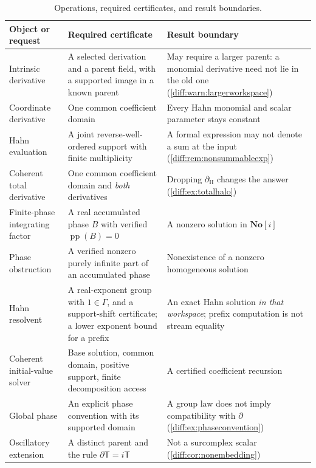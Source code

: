 \documentclass[11pt,letterpaper]{article}
\numberwithin{equation}{section}
\theoremstyle{definition}
\theoremstyle{remark}
\newcommand{\SC}{\mathbf{No}[i]}
\newcommand{\der}{\partial}
\newcommand{\pp}{\operatorname{pp}}
\newcommand{\dercoef}{\der_{\mathrm H}}
\begin{document}
\begin{table}[htbp]
\centering\small
\caption{Operations, required certificates, and result boundaries.}
\label{diff:tab:interface}
\begin{tabularx}{\textwidth}{@{}L{0.24\textwidth}YL{0.27\textwidth}@{}}
\toprule
Object or request & Required certificate & Result boundary \\
\midrule
Intrinsic derivative &
A selected derivation and a parent field, with a supported image in a known
parent &
May require a larger parent: a monomial derivative need not lie in the old one
(\cref{diff:warn:largerworkspace}) \\[0.35em]
Coordinate derivative &
One common coefficient domain &
Every Hahn monomial and scalar parameter stays constant \\[0.35em]
Hahn evaluation &
A joint reverse-well-ordered support with finite multiplicity &
A formal expression may not denote a sum at the input
(\cref{diff:rem:nonsummableexp}) \\[0.35em]
Coherent total derivative &
One common coefficient domain and \emph{both} derivatives &
Dropping $\dercoef$ changes the answer
(\cref{diff:ex:totalhalo}) \\[0.35em]
Finite-phase integrating factor &
A real accumulated phase $B$ with verified $\pp(B)=0$ &
A nonzero solution in $\SC$ \\[0.35em]
Phase obstruction &
A verified nonzero purely infinite part of an accumulated phase &
Nonexistence of a nonzero homogeneous solution \\[0.35em]
Hahn resolvent &
A real-exponent group with $1\in\Gamma$, and a support-shift certificate; a
lower exponent bound for a prefix &
An exact Hahn solution \emph{in that workspace}; prefix computation is not
stream equality \\[0.35em]
Coherent initial-value solver &
Base solution, common domain, positive support, finite decomposition access &
A certified coefficient recursion \\[0.35em]
Global phase &
An explicit phase convention with its supported domain &
A group law does not imply compatibility with $\der$
(\cref{diff:ex:phaseconvention}) \\[0.35em]
Oscillatory extension &
A distinct parent and the rule $\der\mathsf T=i\mathsf T$ &
Not a surcomplex scalar (\cref{diff:cor:nonembedding}) \\
\bottomrule
\end{tabularx}
\end{table}
\end{document}
